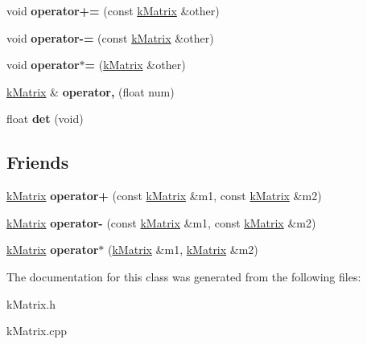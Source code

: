 \begin{DoxyCompactItemize}
\item 
void {\bfseries operator+=} (const \hyperlink{classkMatrix}{k\+Matrix} \&other)\hypertarget{classkMatrix_a131671a495a5412ceaff23e092bfec9b}{}\label{classkMatrix_a131671a495a5412ceaff23e092bfec9b}

\item 
void {\bfseries operator-\/=} (const \hyperlink{classkMatrix}{k\+Matrix} \&other)\hypertarget{classkMatrix_ab40d193c22733471d33bceda42bf1213}{}\label{classkMatrix_ab40d193c22733471d33bceda42bf1213}

\item 
void {\bfseries operator$\ast$=} (\hyperlink{classkMatrix}{k\+Matrix} \&other)\hypertarget{classkMatrix_ac0dccc61cfbabe1da72726559b33cbdf}{}\label{classkMatrix_ac0dccc61cfbabe1da72726559b33cbdf}

\item 
\hyperlink{classkMatrix}{k\+Matrix} \& {\bfseries operator,} (float num)\hypertarget{classkMatrix_a89251b25202e1ae2b7e2fd2b9b4840c4}{}\label{classkMatrix_a89251b25202e1ae2b7e2fd2b9b4840c4}

\item 
float {\bfseries det} (void)\hypertarget{classkMatrix_af2e75801e4461b4d7807741559c73bad}{}\label{classkMatrix_af2e75801e4461b4d7807741559c73bad}

\end{DoxyCompactItemize}
\subsection*{Friends}
\begin{DoxyCompactItemize}
\item 
\hyperlink{classkMatrix}{k\+Matrix} {\bfseries operator+} (const \hyperlink{classkMatrix}{k\+Matrix} \&m1, const \hyperlink{classkMatrix}{k\+Matrix} \&m2)\hypertarget{classkMatrix_a9b9d61523004337a496065dd5cea0d54}{}\label{classkMatrix_a9b9d61523004337a496065dd5cea0d54}

\item 
\hyperlink{classkMatrix}{k\+Matrix} {\bfseries operator-\/} (const \hyperlink{classkMatrix}{k\+Matrix} \&m1, const \hyperlink{classkMatrix}{k\+Matrix} \&m2)\hypertarget{classkMatrix_a267db7ca0cd79f373da986853d070d88}{}\label{classkMatrix_a267db7ca0cd79f373da986853d070d88}

\item 
\hyperlink{classkMatrix}{k\+Matrix} {\bfseries operator$\ast$} (\hyperlink{classkMatrix}{k\+Matrix} \&m1, \hyperlink{classkMatrix}{k\+Matrix} \&m2)\hypertarget{classkMatrix_a65c60053d2f8f7331833722980162ba4}{}\label{classkMatrix_a65c60053d2f8f7331833722980162ba4}

\end{DoxyCompactItemize}


The documentation for this class was generated from the following files\+:\begin{DoxyCompactItemize}
\item 
k\+Matrix.\+h\item 
k\+Matrix.\+cpp\end{DoxyCompactItemize}
